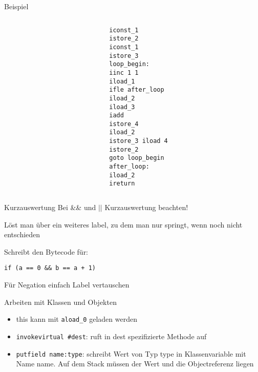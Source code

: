 \documentclass{beamer}
\begin{document}
\begin{frame}{Beispiel}
    \begin{columns}
        \begin{column}{0.60 \textwidth}
        \end{column}
        \begin{column}{0.4 \textwidth}
            \scriptsize
            \texttt{iconst\_1\\istore\_2\\iconst\_1\\istore\_3\\loop\_begin:\\iinc 1 1\\
            iload\_1\\ifle after\_loop\\iload\_2\\iload\_3\\iadd\\istore\_4\\iload\_2\\istore\_3
            iload 4\\istore\_2\\goto loop\_begin\\after\_loop:\\iload\_2\\ireturn}
        \end{column}
    \end{columns}
\end{frame}

\begin{frame}{Kurzauswertung}
    Bei \&\& und $||$ Kurzauswertung beachten!

    Löst man über ein weiteres label, zu dem man nur springt, wenn noch nicht entschieden

    Schreibt den Bytecode für:

    \texttt{if (a == 0 \&\& b == a + 1)}

    \pause

    Für Negation einfach Label vertauschen
\end{frame}

\begin{frame}{Arbeiten mit Klassen und Objekten}
    \begin{itemize}
        \item this kann mit \texttt{aload\_0} geladen werden
        \item \texttt{invokevirtual \#dest}: ruft in dest spezifizierte Methode auf
        \item \texttt{putfield name:type}: schreibt Wert von Typ type in Klassenvariable mit Name name. Auf dem Stack müssen der Wert und die Objectreferenz liegen
    \end{itemize}
\end{frame}
\end{document}
